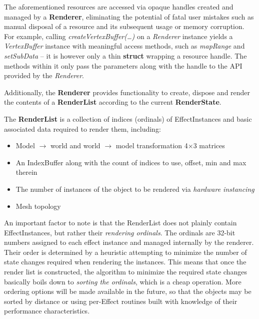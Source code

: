 The aforementioned resources are accessed via opaque handles created and managed by a \textbf{Renderer}, eliminating the potential of fatal user mistakes such as manual disposal of a resource and its subsequent usage or memory corruption. For example, calling \emph{createVertexBuffer(\ldots)} on a \emph{Renderer} instance yields a \emph{VertexBuffer} instance with meaningful access methods, such as \emph{mapRange} and \emph{setSubData} -- it is however only a thin \textbf{struct} wrapping a resource handle. The methods within it only pass the parameters along with the handle to the API provided by the \emph{Renderer}.

Additionally, the \textbf{Renderer} provides functionality to create, dispose and render the contents of a \textbf{RenderList} according to the current \textbf{RenderState}.

The \textbf{RenderList} is a collection of indices (ordinals) of EffectInstances and basic associated data required to render them, including:
	
\begin{itemize}
\item Model $\rightarrow$ world and world $\rightarrow$ model transformation 4×3 matrices
\item An IndexBuffer along with the count of indices to use, offset, min and max therein
\item The number of instances of the object to be rendered via \emph{hardware instancing}
\item Mesh topology
\end{itemize}

An important factor to note is that the RenderList does not plainly contain EffectInstances, but rather their \emph{rendering ordinals}. The ordinals are 32-bit numbers assigned to each effect instance and managed internally by the renderer. Their order is determined by a heuristic attempting to minimize the number of state changes required when rendering the instances. This means that once the render list is constructed, the algorithm to minimize the required state changes basically boils down to \emph{sorting the ordinals}, which is a cheap operation. More ordering options will be made available in the future, so that the objects may be sorted by distance or using per-Effect routines built with knowledge of their performance characteristics.


